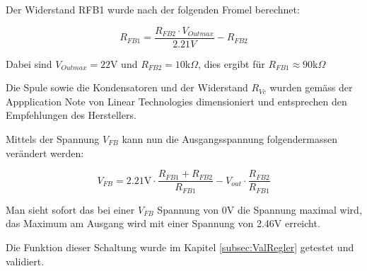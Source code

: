 \documentclass[a4paper]{fhnwreport}
\begin{document}
Der Widerstand RFB1 wurde nach der folgenden Fromel berechnet:

\[
R_{FB1}=\frac{R_{FB2}\cdot V_{Outmax}}{2.21V}-R_{FB2}
\]

Dabei sind $V_{Outmax} =22$V und $R_{FB2} =10$k$\Omega$, dies ergibt für $R_{FB1} \approx 90$k$\Omega$

Die Spule sowie die Kondensatoren und der Widerstand $R_{Vc}$ wurden gemäss der Appplication Note von Linear Technologies dimensioniert und entsprechen den Empfehlungen des Herstellers.

Mittels der Spannung $V_{FB}$ kann nun die Ausgangsspannung folgendermassen verändert werden:

\[
V_{FB}=2.21\text{V}\cdot\frac{R_{FB1}+R_{FB2}}{R_{FB1}}-V_{out}\cdot\frac{R_{FB2}}{R_{FB1}}
\]

Man sieht sofort das bei einer $V_{FB}$ Spannung von 0V die Spannung maximal wird, das Maximum am Ausgang wird mit einer Spannung von 2.46V erreicht. 

Die Funktion dieser Schaltung wurde im Kapitel \ref{subsec:ValRegler} getestet und validiert.
\end{document}
